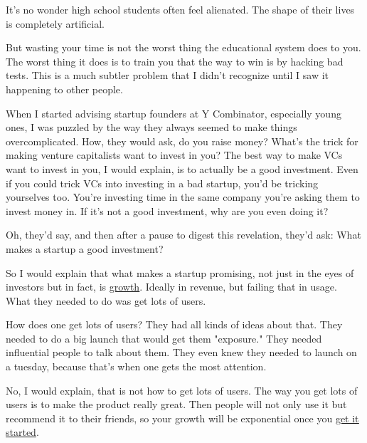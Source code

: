 It's
                  no wonder high school students often feel alienated. The shape
                  of their lives is completely artificial.

But
                  wasting your time is not the worst thing the educational
                  system does to you. The worst thing it does is to train you
                  that the way to win is by hacking bad tests. This is a much
                  subtler problem that I didn't recognize until I saw it
                  happening to other people.

When I started advising
                  startup founders at Y Combinator, especially young ones, I was
                  puzzled by the way they always seemed to make things
                  overcomplicated. How, they would ask, do you raise money?
                  What's the trick for making venture capitalists want to invest
                  in you? The best way to make VCs want to invest in you, I
                  would explain, is to actually be a good investment. Even if
                  you could trick VCs into investing in a bad startup, you'd be
                  tricking yourselves too. You're investing time in the same
                  company you're asking them to invest money in. If it's not a
                  good investment, why are you even doing it?

Oh,
                  they'd say, and then after a pause to digest this revelation,
                  they'd ask: What makes a startup a good investment?

So
                  I would explain that what makes a startup promising, not just
                  in the eyes of investors but in fact, is
                  \href{http://www.paulgraham.com/growth.html}{\underline{growth}}. Ideally in revenue, but failing that in usage. What they
                  needed to do was get lots of users.

How does one
                  get lots of users? They had all kinds of ideas about that.
                  They needed to do a big launch that would get them "exposure."
                  They needed influential people to talk about them. They even
                  knew they needed to launch on a tuesday, because that's when
                  one gets the most attention.

No, I would explain,
                  that is not how to get lots of users. The way you get lots of
                  users is to make the product really great. Then people will
                  not only use it but recommend it to their friends, so your
                  growth will be exponential once you
                  \href{http://www.paulgraham.com/ds.html}{\underline{get it started}}.

